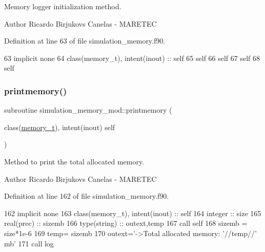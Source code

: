 Memory logger initialization method. 

\begin{DoxyAuthor}{Author}
Ricardo Birjukovs Canelas -\/ M\+A\+R\+E\+T\+EC 
\end{DoxyAuthor}


Definition at line 63 of file simulation\+\_\+memory.\+f90.


\begin{DoxyCode}
63     \textcolor{keywordtype}{implicit none}
64     \textcolor{keywordtype}{class}(memory\_t), \textcolor{keywordtype}{intent(inout)} :: self
65     self%
66     self%
67     self%
68     self%
\end{DoxyCode}
\mbox{\label{namespacesimulation__memory__mod_a16a7a1c7e88fe5a5523d23f83f0e04a0}} 
\subsubsection{\texorpdfstring{printmemory()}{printmemory()}}
{\footnotesize\ttfamily subroutine simulation\+\_\+memory\+\_\+mod\+::printmemory (\begin{DoxyParamCaption}\item[{class(\mbox{\hyperlink{structsimulation__memory__mod_1_1memory__t}{memory\+\_\+t}}), intent(inout)}]{self }\end{DoxyParamCaption})\hspace{0.3cm}{\ttfamily [private]}}



Method to print the total allocated memory. 

\begin{DoxyAuthor}{Author}
Ricardo Birjukovs Canelas -\/ M\+A\+R\+E\+T\+EC 
\end{DoxyAuthor}


Definition at line 162 of file simulation\+\_\+memory.\+f90.


\begin{DoxyCode}
162     \textcolor{keywordtype}{implicit none}
163     \textcolor{keywordtype}{class}(memory\_t), \textcolor{keywordtype}{intent(inout)} :: self
164     \textcolor{keywordtype}{integer} :: size
165     \textcolor{keywordtype}{real(prec)} :: sizemb
166     \textcolor{keywordtype}{type}(string) :: outext,temp
167     \textcolor{keyword}{call }self%
168     sizemb = size*1e-6
169     temp= sizemb
170     outext=\textcolor{stringliteral}{'->Total allocated memory: '}//temp//\textcolor{stringliteral}{' mb'}
171     \textcolor{keyword}{call }log%
\end{DoxyCode}
\mbox{\label{namespacesimulation__memory__mod_a894bd4ec7462fd634d328ee5be4c6483}} 
